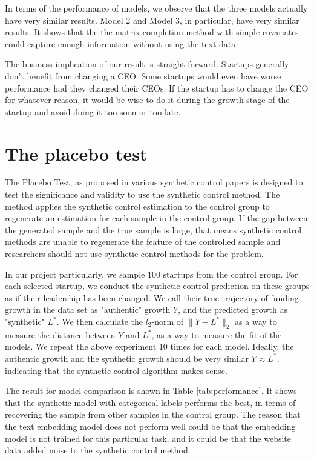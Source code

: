 \documentclass[12pt]{article}
\begin{document}
In terms of the performance of models, we observe that the three models actually have very similar results. Model 2 and Model 3, in particular, have very similar results. It shows that the the matrix completion method with simple covariates could capture enough information without using the text data.

The business implication of our result is straight-forward. Startups generally don't benefit from changing a CEO. Some startups would even have worse performance had they changed their CEOs. If the startup has to change the CEO for whatever reason, it would be wise to do it during the growth stage of the startup and avoid doing it too soon or too late.


\section{The placebo test}
\label{sec:placebo}
The Placebo Test, as proposed in various synthetic control papers \cite{abadie2010synthetic,abadie2003economic} is designed to test the significance and validity to use the synthetic control method. The method applies the synthetic control estimation to the control group to regenerate an estimation for each sample in the control group. If the gap between the generated sample and the true sample is large, that means synthetic control methods are unable to regenerate the feature of the controlled sample and researchers should not use synthetic control methods for the problem.

In our project particularly, we sample 100 startups from the control group. For each selected startup, we conduct the synthetic control prediction on these groups as if their leadership has been changed. We call their true trajectory of funding growth in the data set as "authentic" growth $Y$, and the predicted growth as "synthetic" $L^*$. We then calculate the $l_2$-norm of $\|Y - L^* \|_2$ as a way to measure the distance between $Y$ and $L^*$, as a way to measure the fit of the models. We repeat the above experiment 10 times for each model. Ideally, the authentic growth and the synthetic growth should be very similar $Y \approx L^*$, indicating that the synthetic control algorithm makes sense.

The result for model comparison is shown in Table \ref{tab:performance}. It shows that the synthetic model with categorical labels performs the best, in terms of recovering the sample from other samples in the control group. The reason that the text embedding model does not perform well could be that the embedding model is not trained for this particular task, and it could be that the website data added noise to the synthetic control method.
\end{document}

